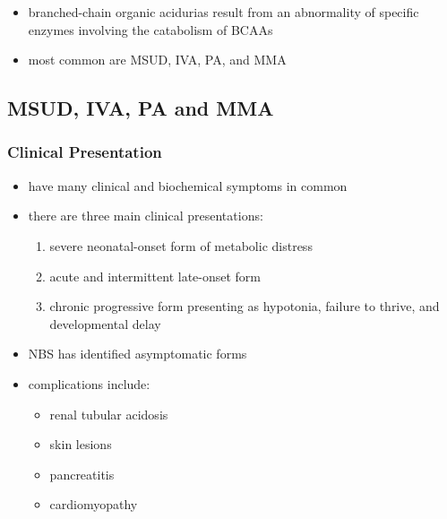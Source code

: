 \documentclass[12pt]{scrartcl}
\begin{document}
\begin{itemize}
\item branched-chain organic acidurias result from an abnormality of
specific enzymes involving the catabolism of BCAAs
\item most common are MSUD, IVA, PA, and MMA
\end{itemize}

\subsection{MSUD, IVA, PA and MMA}
\label{sec:orgc374b2d}
\subsubsection{Clinical Presentation}
\label{sec:orgeb36966}
\begin{itemize}
\item have many clinical and biochemical symptoms in common
\item there are three main clinical presentations:
\begin{enumerate}
\item severe neonatal-onset form of metabolic distress
\item acute and intermittent late-onset form
\item chronic progressive form presenting as hypotonia, failure to
thrive, and developmental delay
\end{enumerate}
\item NBS has identified asymptomatic forms

\item complications include:
\begin{itemize}
\item renal tubular acidosis
\item skin lesions
\item pancreatitis
\item cardiomyopathy
\end{itemize}
\end{itemize}
\end{document}
